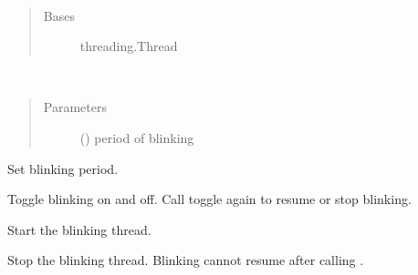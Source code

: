 \documentclass[letterpaper,10pt,english]{sphinxmanual}
\begin{document}

\begin{fulllineitems}
\label{\detokenize{index:rcpy.led.Blink}}~\begin{quote}\begin{description}
\item[{Bases}] \leavevmode
threading.Thread

\end{description}\end{quote}

\begin{fulllineitems}
\label{\detokenize{index:rcpy.led.Blink.set_period}}~\begin{quote}\begin{description}
\item[{Parameters}] \leavevmode
{} () \textendash{} period of blinking

\end{description}\end{quote}

Set blinking period.

\end{fulllineitems}


\begin{fulllineitems}
\label{\detokenize{index:rcpy.led.Blink.toggle}}
Toggle blinking on and off. Call toggle again to resume or stop blinking.

\end{fulllineitems}


\begin{fulllineitems}
\label{\detokenize{index:rcpy.led.Blink.start}}
Start the blinking thread.

\end{fulllineitems}


\begin{fulllineitems}
\label{\detokenize{index:rcpy.led.Blink.stop}}
Stop the blinking thread. Blinking cannot resume after calling {\hyperref[\detokenize{index:rcpy.led.Blink.stop}]{}}.

\end{fulllineitems}


\end{fulllineitems}
\end{document}
